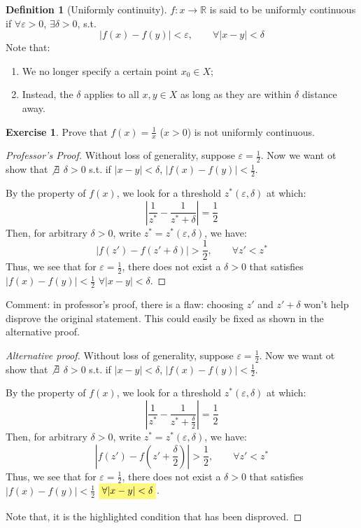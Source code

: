 \documentclass[12pt]{article}
\newcommand{\R}{{\mathbb R}}
\theoremstyle{definition}
\newtheorem{definition}[theorem]{Definition}
\newtheorem{exercise}[theorem]{Exercise}
\theoremstyle{plain}
\newcommand{\highlight}[1]{%
 \colorbox{yellow!50}{$\displaystyle#1$}}
\begin{document}
\begin{definition}
    [Uniformly continuity]
    $f : x \to \R$ is said to be uniformly continuous if $\forall \varepsilon >
    0$, $\exists \delta > 0$, s.t.
    \[
        |f(x) - f(y)| < \varepsilon, \qquad \forall |x - y| < \delta
    \]
    Note that:
    \begin{enumerate}
        \item We no longer specify a certain point $x_0 \in X$;
        \item Instead, the $\delta$ applies to all $x,y\in X$ as long
            as they are within $\delta$ distance away.
    \end{enumerate}
\end{definition}
\begin{exercise}
    Prove that $f(x) = \frac{1}{x}$ ($x > 0$) is not uniformly continuous.
    \begin{proof}[Professor's Proof]
        Without loss of generality, suppose $\varepsilon = \frac{1}{2}$. Now we
        want ot show that $\not\exists$ $\delta > 0$ s.t. if $|x-y| < \delta$,
        $|f(x) - f(y)| < \frac{1}{2}$.

        By the property of $f(x)$, we look for a threshold $z^*(\varepsilon,
        \delta)$ at which:
        \[
            \left| \frac{1}{z^*} - \frac{1}{z^* + \delta}\right| =
            \frac{1}{2}
        \]
        Then, for arbitrary $\delta> 0$, write $z^* = z^*(\varepsilon, \delta)$,
        we have:
        \[
            |f(z') - f(z' + \delta)| > \frac{1}{2}, \qquad \forall z' < z^*
        \]
        Thus, we see that for $\varepsilon  = \frac{1}{2}$, there does not exist
        a $\delta >0$ that satisfies $|f(x) - f(y)| <  \frac{1}{2}$ $\forall
        |x-y| < \delta$.
    \end{proof}
    Comment: in professor's proof, there is a flaw: choosing $z'$ and $z'
    +\delta$ won't help disprove the original statement.  This could easily be
    fixed as shown in the alternative proof.
    \begin{proof}[Alternative proof]
        Without loss of generality, suppose $\varepsilon = \frac{1}{2}$. Now we
        want ot show that $\not\exists$ $\delta > 0$ s.t. if $|x-y| < \delta$,
        $|f(x) - f(y)| < \frac{1}{2}$.

        By the property of $f(x)$, we look for a threshold $z^*(\varepsilon,
        \delta)$ at which:
        \[
            \left| \frac{1}{z^*} - \frac{1}{z^* + \frac{\delta}{2}}\right| =
            \frac{1}{2}
        \]
        Then, for arbitrary $\delta> 0$, write $z^* = z^*(\varepsilon, \delta)$,
        we have:
        \[
            |f(z') - f(z' + \frac{\delta}{2})| > \frac{1}{2}, \qquad \forall z' < z^*
        \]
        Thus, we see that for $\varepsilon  = \frac{1}{2}$, there does not exist
        a $\delta >0$ that satisfies $|f(x) - f(y)| <  \frac{1}{2}$
        $\highlight{\forall |x-y| < \delta}$.

        Note that, it is the highlighted condition that has been disproved.

    \end{proof}
\end{exercise}
\end{document}

